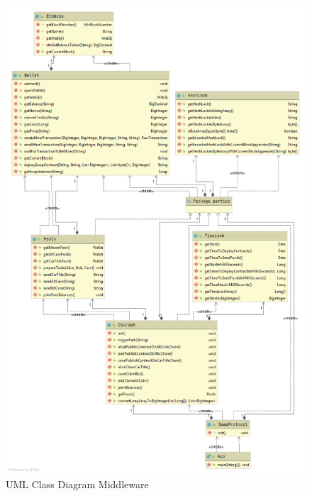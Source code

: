 \begin{figure}[h]
	\includegraphics[width=0.7\paperwidth]{swaps-crop}
	\caption{UML Class Diagram Middleware}
	\label{fig:uml}
\end{figure}
\clearpage

